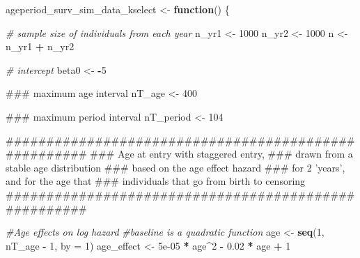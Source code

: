 \documentclass[11pt,]{article}
\newenvironment{Shaded}{\begin{snugshade}}{\end{snugshade}}
\newcommand{\KeywordTok}[1]{\textcolor[rgb]{0.13,0.29,0.53}{\textbf{#1}}}
\newcommand{\DataTypeTok}[1]{\textcolor[rgb]{0.13,0.29,0.53}{#1}}
\newcommand{\DecValTok}[1]{\textcolor[rgb]{0.00,0.00,0.81}{#1}}
\newcommand{\FloatTok}[1]{\textcolor[rgb]{0.00,0.00,0.81}{#1}}
\newcommand{\StringTok}[1]{\textcolor[rgb]{0.31,0.60,0.02}{#1}}
\newcommand{\CommentTok}[1]{\textcolor[rgb]{0.56,0.35,0.01}{\textit{#1}}}
\newcommand{\ControlFlowTok}[1]{\textcolor[rgb]{0.13,0.29,0.53}{\textbf{#1}}}
\newcommand{\OperatorTok}[1]{\textcolor[rgb]{0.81,0.36,0.00}{\textbf{#1}}}
\newcommand{\NormalTok}[1]{#1}
\begin{document}
\begin{Shaded}
\begin{Highlighting}[]
\NormalTok{ageperiod_surv_sim_data_kselect <-}\StringTok{ }\ControlFlowTok{function}\NormalTok{() \{}
  
  \CommentTok{# sample size of individuals from each year}
\NormalTok{  n_yr1 <-}\StringTok{ }\DecValTok{1000}
\NormalTok{  n_yr2 <-}\StringTok{ }\DecValTok{1000}
\NormalTok{  n <-}\StringTok{ }\NormalTok{n_yr1 }\OperatorTok{+}\StringTok{ }\NormalTok{n_yr2}
  
  \CommentTok{# intercept}
\NormalTok{  beta0 <-}\StringTok{ }\OperatorTok{-}\DecValTok{5}

\NormalTok{  ### maximum age interval}
\NormalTok{  nT_age <-}\StringTok{ }\DecValTok{400}

\NormalTok{  ### maximum period interval}
\NormalTok{  nT_period <-}\StringTok{ }\DecValTok{104}

\NormalTok{  #####################################################}
\NormalTok{  ### Age at entry with staggered entry,}
\NormalTok{  ### drawn from a stable age distribution}
\NormalTok{  ### based on the age effect hazard}
\NormalTok{  ### for 2 'years', and for the age that}
\NormalTok{  ### individuals that go from birth to censoring}
\NormalTok{  #####################################################}

  \CommentTok{#Age effects on log hazard}
  \CommentTok{#baseline is a quadratic function}
\NormalTok{  age <-}\StringTok{ }\KeywordTok{seq}\NormalTok{(}\DecValTok{1}\NormalTok{, nT_age }\OperatorTok{-}\StringTok{ }\DecValTok{1}\NormalTok{, }\DataTypeTok{by =} \DecValTok{1}\NormalTok{) }
\NormalTok{  age_effect <-}\StringTok{ }\FloatTok{5e-05} \OperatorTok{*}\StringTok{ }\NormalTok{age}\OperatorTok{^}\DecValTok{2} \OperatorTok{-}\StringTok{ }\FloatTok{0.02} \OperatorTok{*}\StringTok{ }\NormalTok{age }\OperatorTok{+}\StringTok{ }\DecValTok{1} 


\end{Highlighting}
\end{Shaded}
\end{document}
